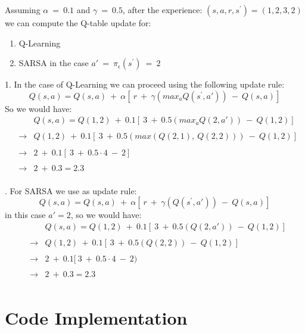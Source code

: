 \documentclass[10pt,a4paper]{article}
\begin{document}
\noindent Assuming $\alpha \:=\: 0.1$ and $\gamma \:=\: 0.5$, after the experience: $(s, a, r, s^{\prime}) = (1,2,3,2)$ we can compute the Q-table update for:
\begin{enumerate}
    \item Q-Learning 
    \item SARSA in the case $a' \:=\: \pi_{\epsilon}(s^{\prime}) \:=\: 2$
\end{enumerate} 
1. In the case of Q-Learning we can proceed using the following update rule:
\begin{equation*}
    Q(s,a) = Q(s,a) \:+\: \alpha [ \:r \:+\: \gamma(max_{a}Q(s^{\prime},a')) \:-\: Q(s,a)]
\end{equation*}
So we would have:
\begin{align*}
    && Q(s,a) = Q(1,2) \:+\: 0.1 [ \:3 \:+\: 0.5(max_{a}Q(2,a')) \:-\: Q(1,2)] \\
    && \\
    &\rightarrow& Q(1,2) \:+\: 0.1 [ \:3 \:+\: 0.5(max(Q(2,1), \:Q(2,2))) \:-\: Q(1,2)] \\
    && \\
    &\rightarrow&2 \:+\: 0.1 [ \:3 \:+\: 0.5\cdot4 \:-\: 2] \\
    && \\
    &\rightarrow&2 \:+\: 0.3 = 2.3 \\
\end{align*}
\vspace{5pt}

. For SARSA we use as update rule:
\begin{equation*}
    Q(s,a) = Q(s,a) \:+\: \alpha [ \:r \:+\: \gamma(Q(s^{\prime},a')) \:-\: Q(s,a)]
\end{equation*}
in this case $a'=2$, so we would have:
\begin{align*}
    && Q(s,a) = Q(1,2) \:+\: 0.1 [ \:3 \:+\: 0.5(Q(2,a'))\:-\: Q(1,2)] \\
    && \\
    &\rightarrow& Q(1,2) \:+\: 0.1 [ \:3 \:+\: 0.5(Q(2,2))\:-\: Q(1,2)] \\
    && \\
    &\rightarrow&2 \:+\: 0.1 [ \:3 \:+\: 0.5\cdot4 \:-\: 2) \\
    && \\
    &\rightarrow&2 \:+\: 0.3 = 2.3 \\
\end{align*}
\newpage



\section{Code Implementation}
\end{document}

